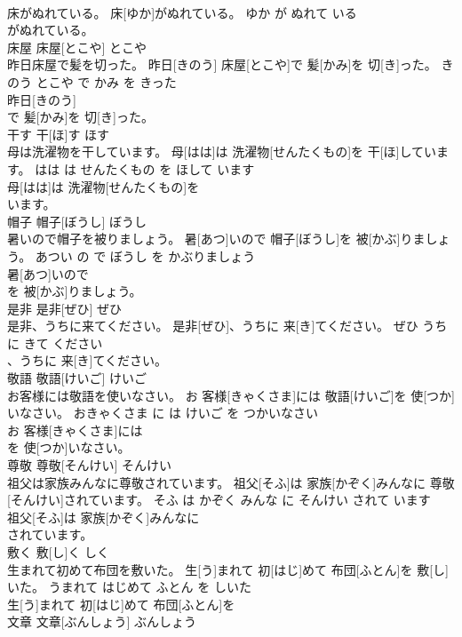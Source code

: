 \documentclass[8pt]{extreport}
\begin{document}
\begin{CJK}{UTF8}{min}
\\	床がぬれている。	床[ゆか]がぬれている。	ゆか が ぬれて いる	
\\	がぬれている。			
\\	床屋	床屋[とこや]	とこや	
\\	昨日床屋で髪を切った。	昨日[きのう] 床屋[とこや]で 髪[かみ]を 切[き]った。	きのう とこや で かみ を きった	
\\	昨日[きのう]
\\	で 髪[かみ]を 切[き]った。			
\\	干す	干[ほ]す	ほす	
\\	母は洗濯物を干しています。	母[はは]は 洗濯物[せんたくもの]を 干[ほ]しています。	はは は せんたくもの を ほして います	
\\	母[はは]は 洗濯物[せんたくもの]を
\\	います。			
\\	帽子	帽子[ぼうし]	ぼうし	
\\	暑いので帽子を被りましょう。	暑[あつ]いので 帽子[ぼうし]を 被[かぶ]りましょう。	あつい の で ぼうし を かぶりましょう	
\\	暑[あつ]いので
\\	を 被[かぶ]りましょう。			
\\	是非	是非[ぜひ]	ぜひ	
\\	是非、うちに来てください。	是非[ぜひ]、うちに 来[き]てください。	ぜひ うち に きて ください	
\\	、うちに 来[き]てください。			
\\	敬語	敬語[けいご]	けいご	
\\	お客様には敬語を使いなさい。	お 客様[きゃくさま]には 敬語[けいご]を 使[つか]いなさい。	おきゃくさま に は けいご を つかいなさい	
\\	お 客様[きゃくさま]には
\\	を 使[つか]いなさい。			
\\	尊敬	尊敬[そんけい]	そんけい	
\\	祖父は家族みんなに尊敬されています。	祖父[そふ]は 家族[かぞく]みんなに 尊敬[そんけい]されています。	そふ は かぞく みんな に そんけい されて います	
\\	祖父[そふ]は 家族[かぞく]みんなに
\\	されています。			
\\	敷く	敷[し]く	しく	
\\	生まれて初めて布団を敷いた。	生[う]まれて 初[はじ]めて 布団[ふとん]を 敷[し]いた。	うまれて はじめて ふとん を しいた	
\\	生[う]まれて 初[はじ]めて 布団[ふとん]を
\\	文章	文章[ぶんしょう]	ぶんしょう	

\end{CJK}
\end{document}
